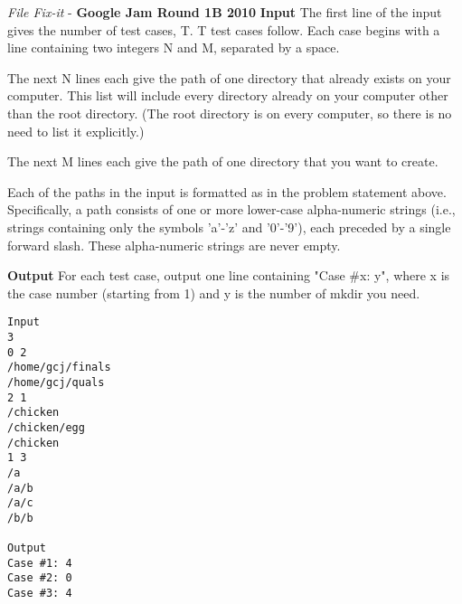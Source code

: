 \begin{problem}{\textit{File Fix-it} - \textbf{Google Jam Round 1B 2010}}
\textbf{Input}
The first line of the input gives the number of test cases, T. T test cases follow. Each case begins with a line containing two integers N and M, separated by a space.

The next N lines each give the path of one directory that already exists on your computer. This list will include every directory already on your computer other than the root directory. (The root directory is on every computer, so there is no need to list it explicitly.)

The next M lines each give the path of one directory that you want to create.

Each of the paths in the input is formatted as in the problem statement above. Specifically, a path consists of one or more lower-case alpha-numeric strings (i.e., strings containing only the symbols 'a'-'z' and '0'-'9'), each preceded by a single forward slash. These alpha-numeric strings are never empty.

\textbf{Output}
For each test case, output one line containing "Case \#x: y", where x is the case number (starting from 1) and y is the number of mkdir you need.

\begin{framed}
	\begin{verbatim}
Input 
3
0 2
/home/gcj/finals
/home/gcj/quals
2 1
/chicken
/chicken/egg
/chicken
1 3
/a
/a/b
/a/c
/b/b

Output 
Case #1: 4
Case #2: 0
Case #3: 4
	\end{verbatim}
\end{framed}

\end{problem}

